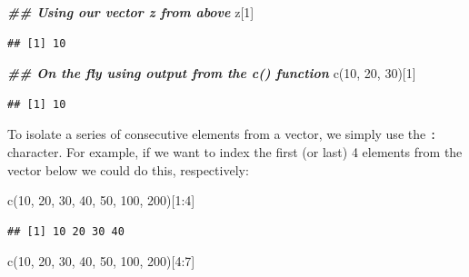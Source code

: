 \documentclass[
]{book}
\newenvironment{Shaded}{\begin{snugshade}}{\end{snugshade}}
\newcommand{\DecValTok}[1]{\textcolor[rgb]{0.00,0.00,0.81}{#1}}
\newcommand{\DocumentationTok}[1]{\textcolor[rgb]{0.56,0.35,0.01}{\textbf{\textit{#1}}}}
\newcommand{\FunctionTok}[1]{\textcolor[rgb]{0.00,0.00,0.00}{#1}}
\newcommand{\NormalTok}[1]{#1}
\newcommand{\SpecialCharTok}[1]{\textcolor[rgb]{0.00,0.00,0.00}{#1}}
\begin{document}
\begin{Shaded}
\begin{Highlighting}[]
\DocumentationTok{\#\# Using our vector z from above}
\NormalTok{z[}\DecValTok{1}\NormalTok{]}
\end{Highlighting}
\end{Shaded}

\begin{verbatim}
## [1] 10
\end{verbatim}

\begin{Shaded}
\begin{Highlighting}[]
\DocumentationTok{\#\# On the fly using output from the c() function}
\FunctionTok{c}\NormalTok{(}\DecValTok{10}\NormalTok{, }\DecValTok{20}\NormalTok{, }\DecValTok{30}\NormalTok{)[}\DecValTok{1}\NormalTok{]}
\end{Highlighting}
\end{Shaded}

\begin{verbatim}
## [1] 10
\end{verbatim}

To isolate a series of consecutive elements from a vector, we simply use the \texttt{:} character. For example, if we want to index the first (or last) 4 elements from the vector below we could do this, respectively:

\begin{Shaded}
\begin{Highlighting}[]
\FunctionTok{c}\NormalTok{(}\DecValTok{10}\NormalTok{, }\DecValTok{20}\NormalTok{, }\DecValTok{30}\NormalTok{, }\DecValTok{40}\NormalTok{, }\DecValTok{50}\NormalTok{, }\DecValTok{100}\NormalTok{, }\DecValTok{200}\NormalTok{)[}\DecValTok{1}\SpecialCharTok{:}\DecValTok{4}\NormalTok{]}
\end{Highlighting}
\end{Shaded}

\begin{verbatim}
## [1] 10 20 30 40
\end{verbatim}

\begin{Shaded}
\begin{Highlighting}[]
\FunctionTok{c}\NormalTok{(}\DecValTok{10}\NormalTok{, }\DecValTok{20}\NormalTok{, }\DecValTok{30}\NormalTok{, }\DecValTok{40}\NormalTok{, }\DecValTok{50}\NormalTok{, }\DecValTok{100}\NormalTok{, }\DecValTok{200}\NormalTok{)[}\DecValTok{4}\SpecialCharTok{:}\DecValTok{7}\NormalTok{]}
\end{Highlighting}
\end{Shaded}
\end{document}
